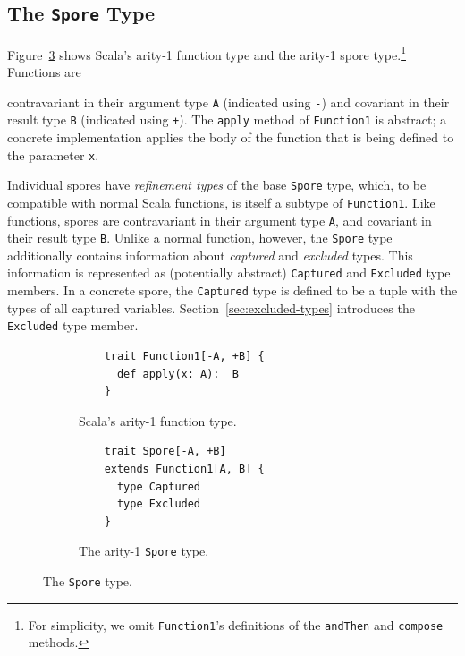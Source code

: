 \documentclass[runningheads]{llncs}
\begin{document}
\begin{sloppypar}
\vspace{2mm}
\subsection{The \texttt{Spore} Type}
\label{sec:spore-type}




Figure~\ref{fig:spore-type} shows Scala's arity-1 function type and the arity-1 spore type.\footnote{For simplicity, we omit \verb+Function1+'s definitions of the \verb+andThen+ and \verb+compose+ methods.}
Functions are

\noindent contravariant in their argument type \verb|A| (indicated using
\verb|-|) and covariant in their result type \verb|B| (indicated
using \verb|+|). The \verb|apply| method of \verb|Function1| is abstract; a concrete implementation applies
the body of the function that is being defined to the parameter \verb|x|.

Individual spores have {\em refinement types} of the base \verb|Spore| type, which, to be compatible with normal Scala functions,
is itself a subtype of \verb|Function1|. Like functions, spores are contravariant in their argument type \verb|A|, and
covariant in their result type \verb|B|. Unlike a normal function,
however, the \verb|Spore| type additionally contains information about
\textit{captured} and \textit{excluded} types. This information is represented
as (potentially abstract) \verb|Captured| and \verb|Excluded| type members. In a
concrete spore, the \verb|Captured| type is defined to be a tuple with the types of all captured variables.
Section~\ref{sec:excluded-types} introduces the \verb|Excluded| type member.


\begin{figure}[t!]
\begin{subfigure}{.5\textwidth}
  \centering
  \begin{lstlisting}
    trait Function1[-A, +B] {
      def apply(x: A):  B
    }
  \end{lstlisting}
  \caption{Scala's arity-1 function type.}
  \label{fig:function-arity1}
\end{subfigure}%
\begin{subfigure}{.5\textwidth}
  \centering
  \begin{lstlisting}
    trait Spore[-A, +B]
    extends Function1[A, B] {
      type Captured
      type Excluded
    }
  \end{lstlisting}
  \caption{The arity-1 \texttt{Spore} type.}
  \label{fig:spore-arity1}
\end{subfigure}%
\vspace{1mm}
\caption{The \texttt{Spore} type.}
\label{fig:spore-type}
\vspace{-2mm}
\end{figure}



\end{sloppypar}
\end{document}

